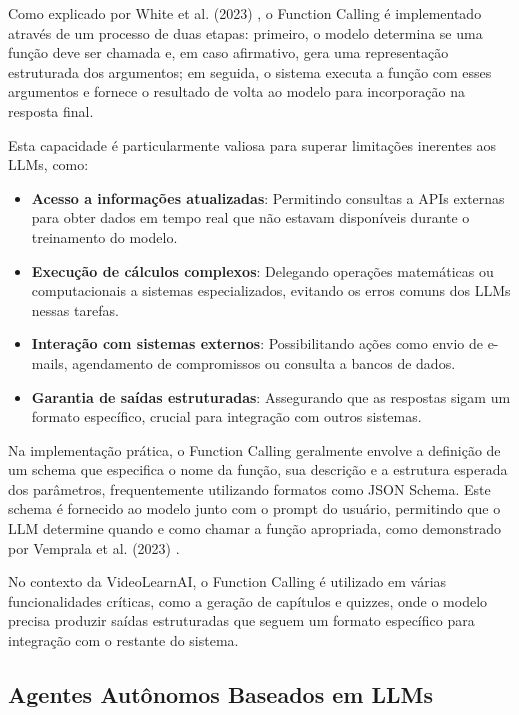 \documentclass[tcc,capa]{texufpel}
\begin{document}
Como explicado por White et al. (2023) \cite{white2023prompt}, o Function Calling é implementado através de um processo de duas etapas: primeiro, o modelo determina se uma função deve ser chamada e, em caso afirmativo, gera uma representação estruturada dos argumentos; em seguida, o sistema executa a função com esses argumentos e fornece o resultado de volta ao modelo para incorporação na resposta final.

Esta capacidade é particularmente valiosa para superar limitações inerentes aos LLMs, como:

\begin{itemize}
    \item \textbf{Acesso a informações atualizadas}: Permitindo consultas a APIs externas para obter dados em tempo real que não estavam disponíveis durante o treinamento do modelo.
    
    \item \textbf{Execução de cálculos complexos}: Delegando operações matemáticas ou computacionais a sistemas especializados, evitando os erros comuns dos LLMs nessas tarefas.
    
    \item \textbf{Interação com sistemas externos}: Possibilitando ações como envio de e-mails, agendamento de compromissos ou consulta a bancos de dados.
    
    \item \textbf{Garantia de saídas estruturadas}: Assegurando que as respostas sigam um formato específico, crucial para integração com outros sistemas.
\end{itemize}

Na implementação prática, o Function Calling geralmente envolve a definição de um schema que especifica o nome da função, sua descrição e a estrutura esperada dos parâmetros, frequentemente utilizando formatos como JSON Schema. Este schema é fornecido ao modelo junto com o prompt do usuário, permitindo que o LLM determine quando e como chamar a função apropriada, como demonstrado por Vemprala et al. (2023) \cite{vemprala2023chatgpt}.

No contexto da VideoLearnAI, o Function Calling é utilizado em várias funcionalidades críticas, como a geração de capítulos e quizzes, onde o modelo precisa produzir saídas estruturadas que seguem um formato específico para integração com o restante do sistema.

\subsection{Agentes Autônomos Baseados em LLMs}
\end{document}
